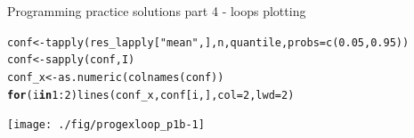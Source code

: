 \documentclass[xcolor=table,       handout,    xcolor=dvipsnames]{beamer}\usepackage[]{graphicx}\usepackage[]{color}
\makeatletter
\newcommand{\hlnum}[1]{\textcolor[rgb]{0,0,0}{#1}}
\newcommand{\hlstr}[1]{\textcolor[rgb]{0.545,0.137,0.137}{#1}}
\newcommand{\hlopt}[1]{\textcolor[rgb]{0,0,0}{#1}}
\newcommand{\hlstd}[1]{\textcolor[rgb]{0,0,0}{#1}}
\newcommand{\hlkwa}[1]{\textcolor[rgb]{1,0,0}{\textbf{#1}}}
\newcommand{\hlkwb}[1]{\textcolor[rgb]{0,0,0}{#1}}
\newcommand{\hlkwc}[1]{\textcolor[rgb]{1,0,1}{#1}}
\newcommand{\hlkwd}[1]{\textcolor[rgb]{0,0,1}{#1}}
\newenvironment{kframe}{%
 \def\at@end@of@kframe{}%
 \ifinner\ifhmode%
  \def\at@end@of@kframe{\end{minipage}}%
  \begin{minipage}{\columnwidth}%
 \fi\fi%
 \def\FrameCommand##1{\hskip\@totalleftmargin \hskip-\fboxsep
 \colorbox{shadecolor}{##1}\hskip-\fboxsep
     \hskip-\linewidth \hskip-\@totalleftmargin \hskip\columnwidth}%
 \MakeFramed {\advance\hsize-\width
   \@totalleftmargin\z@ \linewidth\hsize
   \@setminipage}}%
 {\par\unskip\endMakeFramed%
 \at@end@of@kframe}
\newenvironment{knitrout}{}{} %
\makeatother
\begin{document}

\begin{frame}[fragile]{Programming practice solutions part 4 - loops plotting}
\vspace{-0.17em}
\begin{knitrout}\footnotesize
{}\color{fgcolor}\begin{kframe}
\begin{alltt}
\hlstd{conf} \hlkwb{<-} \hlkwd{tapply}\hlstd{(res_lapply[}\hlstr{"mean"}\hlstd{, ], n, quantile,} \hlkwc{probs}\hlstd{=}\hlkwd{c}\hlstd{(}\hlnum{0.05}\hlstd{,} \hlnum{0.95}\hlstd{))}
\hlstd{conf} \hlkwb{<-} \hlkwd{sapply}\hlstd{(conf, I)}
\hlstd{conf_x} \hlkwb{<-} \hlkwd{as.numeric}\hlstd{(}\hlkwd{colnames}\hlstd{(conf))}
\hlkwa{for}\hlstd{(i} \hlkwa{in} \hlnum{1}\hlopt{:}\hlnum{2}\hlstd{)} \hlkwd{lines}\hlstd{(conf_x, conf[i, ],} \hlkwc{col}\hlstd{=}\hlnum{2}\hlstd{,} \hlkwc{lwd}\hlstd{=}\hlnum{2}\hlstd{)}
\end{alltt}
\end{kframe}

{\centering \texttt{[image: ./fig/progexloop\_p1b-1]} 

}



\end{knitrout}
\end{frame}

\end{document}
